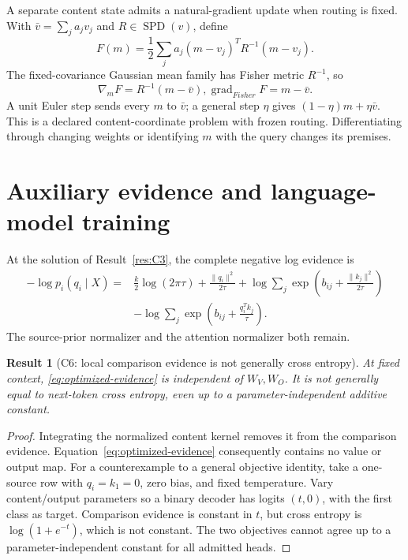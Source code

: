 \documentclass[11pt]{article}
\newtheorem{result}{Result}
\newcommand{\SPD}{\operatorname{SPD}}
\begin{document}
A separate content state admits a natural-gradient update when routing is fixed. With $\bar v=\sum_ja_jv_j$ and $R\in\SPD(v)$, define
\begin{equation}
F(m)=\frac12\sum_ja_j(m-v_j)^TR^{-1}(m-v_j).
\end{equation}
The fixed-covariance Gaussian mean family has Fisher metric $R^{-1}$, so
\begin{equation}
\nabla_mF=R^{-1}(m-\bar v),
\operatorname{grad}_{Fisher}F=m-\bar v.
\end{equation}
A unit Euler step sends every $m$ to $\bar v$; a general step $\eta$ gives $(1-\eta)m+\eta\bar v$. This is a declared content-coordinate problem with frozen routing. Differentiating through changing weights or identifying $m$ with the query changes its premises.

\section{Auxiliary evidence and language-model training}
\label{sec:objective}
At the solution of Result~\ref{res:C3}, the complete negative log evidence is
\begin{align}
-\log p_i(q_i\mid X)={}&\frac{k}{2}\log(2\pi\tau)+\frac{\|q_i\|^2}{2\tau}
+\log\sum_j\exp\left(b_{ij}+\frac{\|k_j\|^2}{2\tau}\right)\nonumber\\
&-\log\sum_j\exp\left(b_{ij}+\frac{q_i^Tk_j}{\tau}\right).
\label{eq:optimized-evidence}
\end{align}
The source-prior normalizer and the attention normalizer both remain.

\begin{result}[C6: local comparison evidence is not generally cross entropy]
\label{res:C6}
At fixed context, \eqref{eq:optimized-evidence} is independent of $W_V,W_O$. It is not generally equal to next-token cross entropy, even up to a parameter-independent additive constant.
\end{result}
\begin{proof}
Integrating the normalized content kernel removes it from the comparison evidence. Equation~\eqref{eq:optimized-evidence} consequently contains no value or output map. For a counterexample to a general objective identity, take a one-source row with $q_i=k_1=0$, zero bias, and fixed temperature. Vary content/output parameters so a binary decoder has logits $(t,0)$, with the first class as target. Comparison evidence is constant in $t$, but cross entropy is $\log(1+e^{-t})$, which is not constant. The two objectives cannot agree up to a parameter-independent constant for all admitted heads.
\end{proof}
\end{document}
